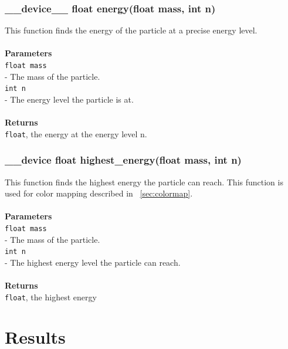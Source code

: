 \documentclass[a4paper, 10pt]{article}
\def\mar{\hspace*{5mm}}
\begin{document}
        \subsubsection{\_\_device\_\_ float energy(float mass, int n)}
        This function finds the energy of the particle at a precise energy level.\\
        \\{\bf Parameters}\\
        \verb|float mass|\\\mar- The mass of the particle.\\
        \verb|int n|\\\mar- The energy level the particle is at.\\
        \\{\bf Returns}\\
        \verb|float|, the energy at the energy level n.

        \vspace{1cm}
        \subsubsection{\_\_device float highest\_energy(float mass, int n)}
        This function finds the highest energy the particle can reach. This function
        is used for color mapping described in ~\ref{sec:colormap}.\\
        \\{\bf Parameters}\\
        \verb|float mass|\\\mar- The mass of the particle.\\
        \verb|int n|\\\mar- The highest energy level the particle can reach.\\
        \\{\bf Returns}\\
        \verb|float|, the highest energy

\newpage
\section{Results}
\end{document}
